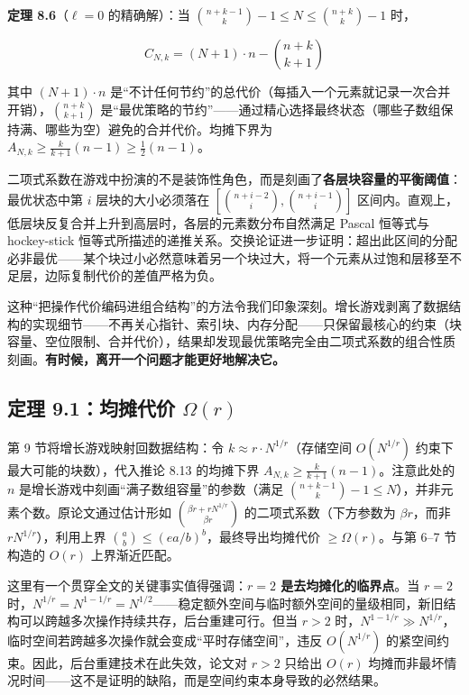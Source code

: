 \documentclass[12pt,a4paper]{ctexart}
\begin{document}
\textbf{定理 8.6}（$\ell = 0$ 的精确解）：当 $\binom{n+k-1}{k} - 1 \le N \le \binom{n+k}{k} - 1$ 时，

\[
C_{N,k} = (N+1) \cdot n - \binom{n+k}{k+1}
\]

其中 $(N+1)\cdot n$ 是``不计任何节约''的总代价（每插入一个元素就记录一次合并开销），$\binom{n+k}{k+1}$ 是``最优策略的节约''——通过精心选择最终状态（哪些子数组保持满、哪些为空）避免的合并代价。均摊下界为 $A_{N,k} \ge \frac{k}{k+1}(n-1) \ge \frac{1}{2}(n-1)$。

二项式系数在游戏中扮演的不是装饰性角色，而是刻画了\textbf{各层块容量的平衡阈值}：最优状态中第 $i$ 层块的大小必须落在 $[\binom{n+i-2}{i}, \binom{n+i-1}{i}]$ 区间内。直观上，低层块反复合并上升到高层时，各层的元素数分布自然满足 Pascal 恒等式与 hockey-stick 恒等式所描述的递推关系。交换论证进一步证明：超出此区间的分配必非最优——某个块过小必然意味着另一个块过大，将一个元素从过饱和层移至不足层，边际复制代价的差值严格为负。

这种``把操作代价编码进组合结构''的方法令我们印象深刻。增长游戏剥离了数据结构的实现细节——不再关心指针、索引块、内存分配——只保留最核心的约束（块容量、空位限制、合并代价），结果却发现最优策略完全由二项式系数的组合性质刻画。\textbf{有时候，离开一个问题才能更好地解决它。}

\subsection{定理 9.1：均摊代价 $\Omega(r)$}

第 9 节将增长游戏映射回数据结构：令 $k \approx r \cdot N^{1/r}$（存储空间 $O(N^{1/r})$ 约束下最大可能的块数），代入推论 8.13 的均摊下界 $A_{N,k} \ge \frac{k}{k+1}(n-1)$。注意此处的 $n$ 是增长游戏中刻画``满子数组容量''的参数（满足 $\binom{n+k-1}{k}-1 \le N$），并非元素个数。原论文通过估计形如 $\binom{\beta r + rN^{1/r}}{\beta r}$ 的二项式系数（下方参数为 $\beta r$，而非 $rN^{1/r}$），利用上界 $\binom{a}{b} \le (ea/b)^b$，最终导出均摊代价 $\ge \Omega(r)$。与第 6–7 节构造的 $O(r)$ 上界渐近匹配。

这里有一个贯穿全文的关键事实值得强调：\textbf{$r = 2$ 是去均摊化的临界点}。当 $r = 2$ 时，$N^{1/r} = N^{1-1/r} = N^{1/2}$——稳定额外空间与临时额外空间的量级相同，新旧结构可以跨越多次操作持续共存，后台重建可行。但当 $r > 2$ 时，$N^{1-1/r} \gg N^{1/r}$，临时空间若跨越多次操作就会变成``平时存储空间''，违反 $O(N^{1/r})$ 的紧空间约束。因此，后台重建技术在此失效，论文对 $r > 2$ 只给出 $O(r)$ 均摊而非最坏情况时间——这不是证明的缺陷，而是空间约束本身导致的必然结果。

\end{document}
